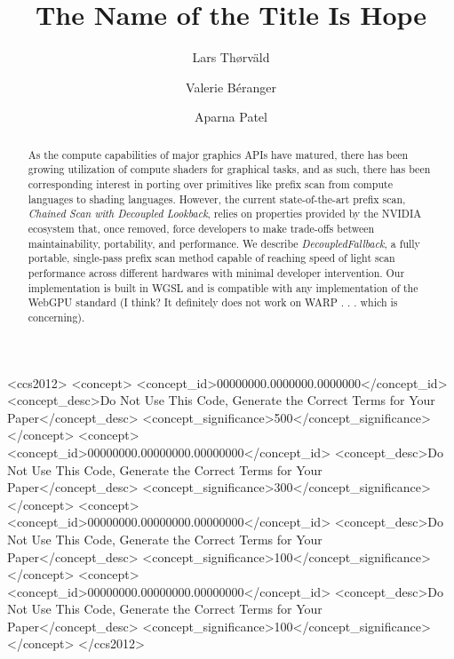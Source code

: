 \documentclass[sigconf]{acmart}
\begin{document}
\title{The Name of the Title Is Hope}

\author{Lars Th{\o}rv{\"a}ld}

\author{Valerie B\'eranger}

\author{Aparna Patel}

\renewcommand{\shortauthors}{Trovato et al.}

\begin{abstract}
  As the compute capabilities of major graphics APIs have matured, there has been growing utilization of compute shaders for graphical tasks, and as such, there has been corresponding interest in porting over primitives like prefix scan from compute languages to shading languages. However, the current state-of-the-art prefix scan, \emph{Chained Scan with Decoupled Lookback}, relies on properties provided by the NVIDIA ecosystem that, once removed, force developers to make trade-offs between maintainability, portability, and performance. We describe \emph{DecoupledFallback}, a fully portable, single-pass prefix scan method capable of reaching speed of light scan performance across different hardwares with minimal developer intervention. Our implementation is built in WGSL and is compatible with any implementation of the WebGPU standard (I think? It definitely does not work on WARP . . . which is concerning).
\end{abstract}

\begin{CCSXML}
  <ccs2012>
  <concept>
  <concept_id>00000000.0000000.0000000</concept_id>
  <concept_desc>Do Not Use This Code, Generate the Correct Terms for Your Paper</concept_desc>
  <concept_significance>500</concept_significance>
  </concept>
  <concept>
  <concept_id>00000000.00000000.00000000</concept_id>
  <concept_desc>Do Not Use This Code, Generate the Correct Terms for Your Paper</concept_desc>
  <concept_significance>300</concept_significance>
  </concept>
  <concept>
  <concept_id>00000000.00000000.00000000</concept_id>
  <concept_desc>Do Not Use This Code, Generate the Correct Terms for Your Paper</concept_desc>
  <concept_significance>100</concept_significance>
  </concept>
  <concept>
  <concept_id>00000000.00000000.00000000</concept_id>
  <concept_desc>Do Not Use This Code, Generate the Correct Terms for Your Paper</concept_desc>
  <concept_significance>100</concept_significance>
  </concept>
  </ccs2012>
\end{CCSXML}
\end{document}
